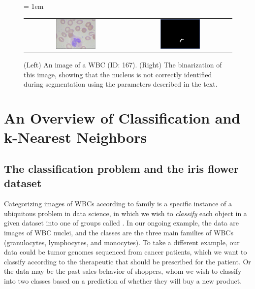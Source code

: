 \begin{figure}[h]
\centering
\tabcolsep = 1em
\mySfFamily
\begin{tabular}{c c}
\includegraphics[width = 0.4\textwidth]{../images/WBC_167.png} & \includegraphics[width = 0.4\textwidth]{../images/WBC_167_segmentation.png}
\end{tabular}
\caption{(Left) An image of a WBC (ID: 167). (Right) The binarization of this image, showing that the nucleus is not correctly identified during segmentation using the parameters described in the text.}
\label{fig:segmentation_imperfect}
\end{figure}





\FloatBarrier
{}
\section{An Overview of Classification and k-Nearest Neighbors}
\label{sec:knn}


\subsection{The classification problem and the iris flower dataset}

Categorizing images of WBCs according to family is a specific instance of a ubiquitous problem in data science, in which we wish to \textit{classify} each object in a given dataset into one of  groups called . In our ongoing example, the data are images of WBC nuclei, and the classes are the three main families of WBCs (granulocytes, lymphocytes, and monocytes). To take a different example, our data could be tumor genomes sequenced from cancer patients, which we want to classify according to the therapeutic that should be prescribed for the patient. Or the data may be the past sales behavior of shoppers, whom we wish to classify into two classes based on a prediction of whether they will buy a new product.

